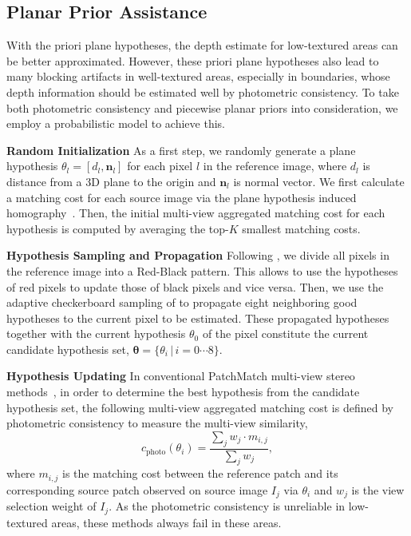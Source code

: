 \documentclass[letterpaper]{article} %
\begin{document}
\subsection{Planar Prior Assistance}

With the priori plane hypotheses, the depth estimate for low-textured areas can be better approximated. However, these priori plane hypotheses also lead to many blocking artifacts in well-textured areas, especially in boundaries, whose depth information should be estimated well by photometric consistency. To take both photometric consistency and piecewise planar priors into consideration, we employ a probabilistic model to achieve this.

\noindent\textbf{Random Initialization} As a first step, we randomly generate a plane hypothesis $\theta_{l}=[d_{l},\boldsymbol{n}_{l}]$ for each pixel ${l}$ in the reference image, where $d_{l}$ is distance from a 3D plane to the origin and $\boldsymbol{n}_{l}$ is normal vector. We first calculate a matching cost for each source image via the plane hypothesis induced homography~\cite{Hartley2004Multiple}. Then, the initial multi-view aggregated matching cost for each hypothesis is computed by averaging the top-$K$ smallest matching costs.

\noindent\textbf{Hypothesis Sampling and Propagation} Following \cite{Galliani2015Massively,Xu2018Multi}, we divide all pixels in the reference image into a Red-Black pattern. This allows to use the hypotheses of red pixels to update those of black pixels and vice versa. Then, we use the adaptive checkerboard sampling of \cite{Xu2018Multi} to propagate eight neighboring good hypotheses to the current pixel to be estimated. These propagated hypotheses together with the current hypothesis $\theta_{0}$ of the pixel constitute the current candidate hypothesis set, $\boldsymbol{\theta}=\{\theta_{i}\,|\,i=0\cdots8\}$.

\noindent\textbf{Hypothesis Updating} In conventional PatchMatch multi-view stereo methods~\cite{Zheng2014PatchMatch,Schonberger2016Pixelwise,Xu2018Multi}, in order to determine the best hypothesis from the candidate hypothesis set, the following multi-view aggregated matching cost is defined by photometric consistency to measure the multi-view similarity,
\begin{equation}\label{eq:1}
c_{\text{photo}}(\theta_{i})=\frac{\sum_{j} w_{j}\cdot m_{i,j}}{\sum_{j} w_{j}},
\end{equation}
where $m_{i,j}$ is the matching cost between the reference patch and its corresponding source patch observed on source image $I_{j}$ via $\theta_{i}$ and $w_{j}$ is the view selection weight of $I_{j}$. As the photometric consistency is unreliable in low-textured areas, these methods always fail in these areas.
\end{document}
